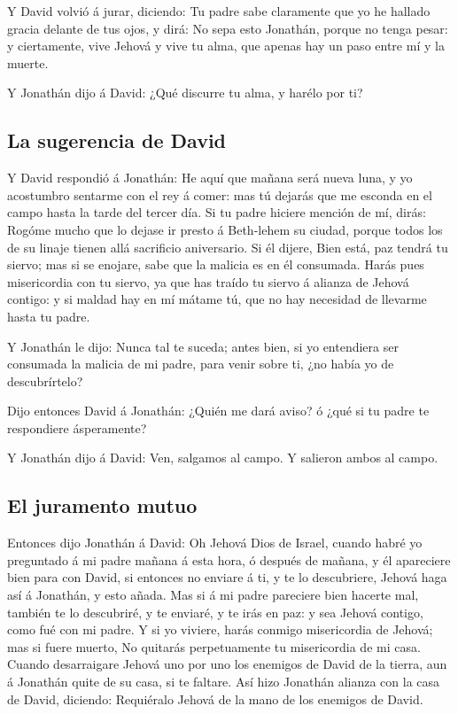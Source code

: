  Y David volvió á jurar, diciendo: Tu padre sabe
claramente que yo he hallado gracia delante de tus ojos, y dirá: No sepa
esto Jonathán, porque no tenga pesar: y ciertamente, vive Jehová y vive
tu alma, que apenas hay un paso entre mí y la muerte.

 Y Jonathán dijo á David: ¿Qué discurre tu alma, y harélo
por ti?

\hypertarget{la-sugerencia-de-david}{%
\subsection{La sugerencia de David}\label{la-sugerencia-de-david}}

 Y David respondió á Jonathán: He aquí que mañana será
nueva luna, y yo acostumbro sentarme con el rey á comer: mas tú dejarás
que me esconda en el campo hasta la tarde del tercer día. 
Si tu padre hiciere mención de mí, dirás: Rogóme mucho que lo dejase ir
presto á Beth-lehem su ciudad, porque todos los de su linaje tienen allá
sacrificio aniversario.  Si él dijere, Bien está, paz
tendrá tu siervo; mas si se enojare, sabe que la malicia es en él
consumada.  Harás pues misericordia con tu siervo, ya que
has traído tu siervo á alianza de Jehová contigo: y si maldad hay en mí
mátame tú, que no hay necesidad de llevarme hasta tu padre.

 Y Jonathán le dijo: Nunca tal te suceda; antes bien, si
yo entendiera ser consumada la malicia de mi padre, para venir sobre ti,
¿no había yo de descubrírtelo?

 Dijo entonces David á Jonathán: ¿Quién me dará aviso? ó
¿qué si tu padre te respondiere ásperamente?

 Y Jonathán dijo á David: Ven, salgamos al campo. Y
salieron ambos al campo.

\hypertarget{el-juramento-mutuo}{%
\subsection{El juramento mutuo}\label{el-juramento-mutuo}}

 Entonces dijo Jonathán á David: Oh Jehová Dios de
Israel, cuando habré yo preguntado á mi padre mañana á esta hora, ó
después de mañana, y él apareciere bien para con David, si entonces no
enviare á ti, y te lo descubriere,  Jehová haga así á
Jonathán, y esto añada. Mas si á mi padre pareciere bien hacerte mal,
también te lo descubriré, y te enviaré, y te irás en paz: y sea Jehová
contigo, como fué con mi padre.  Y si yo viviere, harás
conmigo misericordia de Jehová; mas si fuere muerto,  No
quitarás perpetuamente tu misericordia de mi casa. Cuando desarraigare
Jehová uno por uno los enemigos de David de la tierra, aun á Jonathán
quite de su casa, si te faltare.  Así hizo Jonathán
alianza con la casa de David, diciendo: Requiéralo Jehová de la mano de
los enemigos de David.

